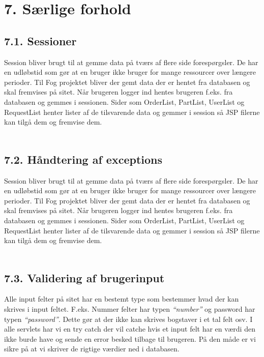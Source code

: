 \documentclass[11pt]{report}
\begin{document}
\chapter*{7. Særlige forhold}

\section*{7.1. Sessioner}
Session bliver brugt til at gemme data på tværs af flere side
forespørgsler. De har en udløbstid som gør at en bruger ikke bruger
for mange ressourcer over længere perioder. Til Fog projektet bliver
der gemt data der er hentet fra databasen og skal fremvises på
sitet. Når brugeren logger ind hentes brugeren f.eks. fra databasen og
gemmes i sessionen. Sider som OrderList, PartList, UserList og
RequestList henter lister af de tilsvarende data og gemmer i session
så JSP filerne kan tilgå dem og fremvise dem. \\\\

\section*{7.2. Håndtering af exceptions}
Session bliver brugt til at gemme data på tværs af flere side
forespørgsler. De har en udløbstid som gør at en bruger ikke bruger
for mange ressourcer over længere perioder. Til Fog projektet bliver
der gemt data der er hentet fra databasen og skal fremvises på
sitet. Når brugeren logger ind hentes brugeren f.eks. fra databasen og
gemmes i sessionen. Sider som OrderList, PartList, UserList og
RequestList henter lister af de tilsvarende data og gemmer i session
så JSP filerne kan tilgå dem og fremvise dem. \\\\

\section*{7.3. Validering af brugerinput}
Alle input felter på sitet har en bestemt type som bestemmer hvad der
kan skrives i input feltet. F.eks. Nummer felter har typen
\textit{“number”} og password har typen \textit{“password”}. Dette gør
at der ikke kan skrives bogstaver i et tal felt osv. I alle servlets
har vi en try catch der vil catche hvis et input felt har en værdi den
ikke burde have og sende en error besked tilbage til brugeren. På den
måde er vi sikre på at vi skriver de rigtige værdier ned i databasen.
\newpage
\end{document}

